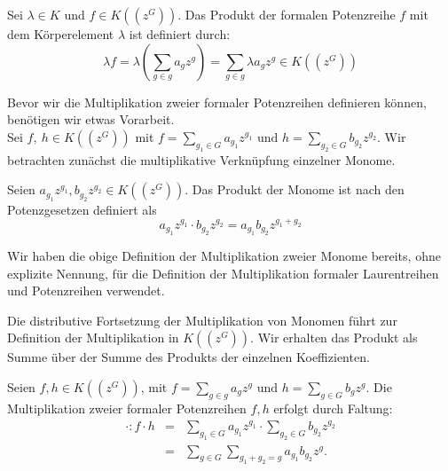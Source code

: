 %
%
%
\begin{defn}\label{MultiplikationMitKörperelement}
Sei $\lambda \in K$ und $f \in K\left(\left(z^{G}\right)\right)$. Das Produkt der formalen Potenzreihe $f$ mit dem Körperelement $\lambda$ ist definiert durch: \[\lambda f = \lambda \left(\sum_{g \in g}^{} a_g z^g\right) = \sum_{g \in g}^{} \lambda a_g z^g \in K\left(\left(z^{G}\right)\right)\]
\end{defn}
  
Bevor wir die Multiplikation zweier formaler Potenzreihen definieren können, benötigen wir etwas Vorarbeit.\\
Sei $f,~ h \in K\left(\left(z^{G}\right)\right)$ mit $ f = \sum_{g_1 \in G}^{} a_{g_1} z^{g_1} \text{ und } h = \sum_{g_2 \in G}^{} b_{g_2} z^{g_2} $. 
%
%
%
%
%
%
Wir betrachten zunächst die multiplikative Verknüpfung einzelner Monome. 
\begin{defn}
Seien $a_{g_1} z^{g_1}, b_{g_2} z^{g_2} \in K\left(\left(z^G\right)\right)$. Das Produkt der Monome ist nach den Potenzgesetzen definiert als 
\[a_{g_1} z^{g_1} \cdot b_{g_2}z^{g_2} = a_{g_1} b_{g_2} z^{g_1 + g_2}\]
\end{defn}
%
%
\begin{bem}
Wir haben die obige Definition der Multiplikation zweier Monome bereits, ohne explizite Nennung, für die Definition der Multiplikation formaler Laurentreihen und Potenzreihen verwendet. 
\end{bem}
%
%
%
%
%
%
%
Die distributive Fortsetzung der Multiplikation von Monomen führt zur Definition der Multiplikation in $K\left(\left(z^{G}\right)\right)$. Wir erhalten das Produkt als Summe über der Summe des Produkts der einzelnen Koeffizienten.
%
%
%
\begin{defn}\label{MultiplikationformalePotenzreihen}
Seien $f, h \in K\left(\left(z^G\right)\right)$, mit $f = \sum_{g \in g}^{} a_g z^g \text{ und } h = \sum_{g \in G}^{} b_g z^g$. Die Multiplikation zweier formaler Potenzreihen $f, h$ erfolgt durch Faltung: 
\begin{eqnarray*}\label{eq: multPotenzreihenkoerper}  
\cdot\colon f\cdot h &=& \sum_{g_1 \in G}^{} a_{g_1} z^{g_1} \cdot \sum_{g_2 \in G}^{} b_{g_2} z^{g_2} \\
&=& \sum_{g \in G}^{}\sum_{g_1 + g_2 = g}^{}a_{g_1} b_{g_2}z^g.  
\end{eqnarray*} 
\end{defn}

